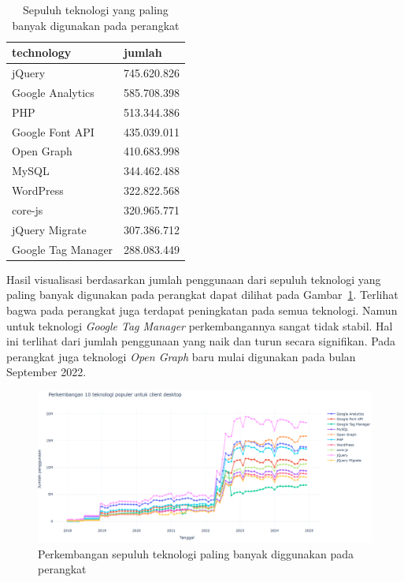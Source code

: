 \begin{table}[H]
\centering
\caption{Sepuluh teknologi yang paling banyak digunakan pada perangkat \desktop}
\label{tab:sepuluhdesktopreal}
\begin{tabular}{|l|l|}
\hline
technology & jumlah \\ \hline
jQuery & 745.620.826 \\ \hline
Google Analytics & 585.708.398 \\ \hline
PHP & 513.344.386 \\ \hline
Google Font API & 435.039.011 \\ \hline
Open Graph & 410.683.998 \\ \hline
MySQL & 344.462.488 \\ \hline
WordPress & 322.822.568 \\ \hline
core-js & 320.965.771 \\ \hline
jQuery Migrate & 307.386.712 \\ \hline
Google Tag Manager & 288.083.449 \\ \hline
\end{tabular}
\end{table}

Hasil visualisasi berdasarkan jumlah penggunaan dari sepuluh teknologi yang paling banyak digunakan pada perangkat \desktop dapat dilihat pada Gambar~\ref{fig:sepuluhdesktopreal}. Terlihat bagwa pada perangkat \desktop juga terdapat peningkatan pada semua teknologi. Namun untuk teknologi \textit{Google Tag Manager} perkembangannya sangat tidak stabil. Hal ini terlihat dari jumlah penggunaan yang naik dan turun secara signifikan. Pada perangkat \desktop juga teknologi \textit{Open Graph} baru mulai digunakan pada bulan September 2022.

\begin{figure}[H]
    \centering
    \includegraphics[width=0.7\linewidth]{Gambar/Perkembangan desktop real.png}
    \caption{Perkembangan sepuluh teknologi paling banyak diggunakan pada perangkat \desktop}
    \label{fig:sepuluhdesktopreal}
\end{figure}

